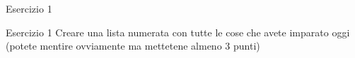 \begin{frame}{Esercizio 1}


\begin{esercizio}{Esercizio 1}
Creare una lista numerata con tutte le cose che avete imparato oggi (potete
mentire ovviamente ma mettetene almeno 3 punti)
\end{esercizio}

\end{frame}



